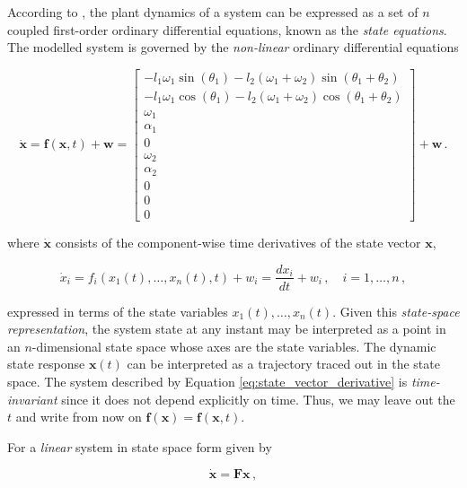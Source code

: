 According to  \citeauthor{rowell2002state} \cite{rowell2002state}, the plant dynamics of a system can be expressed as a set of $n$ coupled first-order ordinary differential equations, known as the \emph{state equations}. The modelled system is governed by the \emph{non-linear} ordinary differential equations

\begin{equation} \label{eq:state_vector_derivative}
  \dot{\mathbf{x}} = \mathbf{f}(\mathbf{x}, t) + \mathbf{w} = \left[\begin{smallmatrix}
  -l_1 \omega_1 \sin(\theta_1)  - l_2 (\omega_1 + \omega_2) \sin(\theta_1 + \theta_2) \\
  -l_1 \omega_1 \cos(\theta_1)  - l_2 (\omega_1 + \omega_2) \cos(\theta_1 + \theta_2) \\ \omega_1 \\ \alpha_1 \\ 0 \\ \omega_2 \\ \alpha_2 \\ 0 \\ 0 \\ 0
  \end{smallmatrix}\right] + \mathbf{w}\,.
\end{equation}

\noindent
where $\dot{\mathbf{x}}$ consists of the component-wise time derivatives of the state vector $\mathbf{x}$, 

\begin{equation}
  \dot{x}_i = f_i(x_1(t), \dots, x_n(t), t) + w_i = \frac{dx_i}{dt} + w_i\,, \quad i = 1, \dots, n\,,
\end{equation}

\noindent
expressed in terms of the state variables $x_1(t), \dots, x_n(t)$. Given this \emph{state-space representation}, the system state at any instant may be interpreted as a point in an $n$-dimensional state space whose axes are the state variables. The dynamic state response $\mathbf{x}(t)$ can be interpreted as a trajectory traced out in the state space. The system described by Equation \ref{eq:state_vector_derivative} is \emph{time-invariant} since it does not depend explicitly on time. Thus, we may leave out the $t$ and write from now on $\mathbf{f}(\mathbf{x}) = \mathbf{f}(\mathbf{x}, t)$.

For a \emph{linear} system in state space form given by

\begin{equation}\label{eq:linear_continuous}
  \dot{\mathbf{x}} = \mathbf{F} \mathbf{x}\,,
\end{equation}

